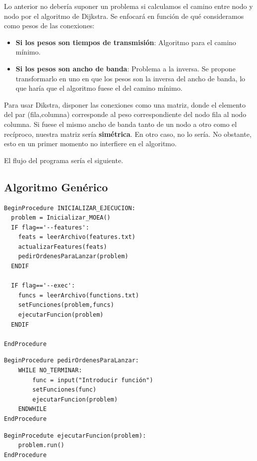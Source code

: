 \documentclass{article}
\begin{document}
Lo anterior no debería suponer un problema si calculamos el camino entre nodo y nodo por el algoritmo de Dijkstra. Se enfocará en función de qué consideramos como pesos de las conexiones:

\begin{itemize}
	\item \textbf{Si los pesos son tiempos de transmisión}: Algoritmo para el camino mínimo.
	\item \textbf{Si los pesos son ancho de banda}: Problema a la inversa. Se propone transformarlo en uno en que los pesos son la inversa del ancho de banda, lo que haría que el algoritmo fuese el del camino mínimo.
\end{itemize}

Para usar Dikstra, disponer las conexiones como una matriz, donde el elemento del par (fila,columna) corresponde al peso correspondiente del nodo fila al nodo columna. Si fuese el mismo ancho de banda tanto de un nodo a otro como el recíproco, nuestra matriz sería \textbf{simétrica}. En otro caso, no lo sería. No obstante, esto en un primer momento no interfiere en el algoritmo.

El flujo del programa sería el siguiente.

\subsection{Algoritmo Genérico}

\begin{verbatim}
BeginProcedure INICIALIZAR_EJECUCION:
  problem = Inicializar_MOEA()
  IF flag=='--features':
  	feats = leerArchivo(features.txt)
  	actualizarFeatures(feats)
  	pedirOrdenesParaLanzar(problem)
  ENDIF
  
  IF flag=='--exec':
  	funcs = leerArchivo(functions.txt)
  	setFunciones(problem,funcs)
  	ejecutarFuncion(problem)
  ENDIF
  	
EndProcedure
\end{verbatim}

\begin{verbatim}
BeginProcedure pedirOrdenesParaLanzar:
	WHILE NO_TERMINAR:
		func = input("Introducir función")
		setFunciones(func)
		ejecutarFuncion(problem)
	ENDWHILE
EndProcedure
\end{verbatim}

\begin{verbatim}
BeginProcedute ejecutarFuncion(problem):
	problem.run()
EndProcedure
\end{verbatim}
\end{document}
